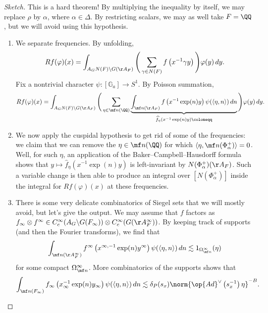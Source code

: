 \documentclass{article}
\begin{document}
\begin{proof}[Sketch]
	This is a hard theorem! By multiplying the inequality by itself, we may replace $\rho$ by $\alpha$, where $\alpha\in\Delta$. By restricting scalars, we may as well take $F=\QQ$, but we will avoid using this hypothesis.
	\begin{enumerate}
		\item We separate frequencies. By unfolding,
		\[Rf(\varphi)(x)=\int_{A_GN(F)\backslash G(\AA_F)}\Bigg(\sum_{\gamma\in N(F)}f\left(x^{-1}\gamma y\right)\Bigg)\varphi(y)\,dy.\]
		Fix a nontrivial character $\psi\colon[\mathbb G_a]\to S^1$. By Poisson summation,
		\[Rf(\varphi)(x)=\int_{A_GN(F)\backslash G(\AA_F)}\Bigg(\sum_{\eta\in\mf n(\QQ)}\underbrace{\int_{\mf n(\AA_F)}f\left(x^{-1}\exp(n)y\right)\psi(\langle\eta,n\rangle)\,dn}_{\widehat f_\eta\left(x^{-1}\exp(n)y\right)\coloneqq}\Bigg)\varphi(y)\,dy.\]
		
		\item We now apply the cuspidal hypothesis to get rid of some of the frequencies: we claim that we can remove the $\eta\in\mf n(\QQ)$ for which $\langle\eta,\mf n(\Phi_\alpha^+)\rangle=0$. Well, for such $\eta$, an application of the Baker--Campbell--Hausdorff formula shows that $y\mapsto\widehat f_\eta\left(x^{-1}\exp(n)y\right)$ is left-invariant by $N(\Phi_\alpha^+)(\AA_F)$. Such a variable change is then able to produce an integral over $[N(\Phi_\alpha^+)]$ inside the integral for $Rf(\varphi)(x)$ at these frequencies.

		\item There is some very delicate combinatorics of Siegel sets that we will mostly avoid, but let's give the output. We may assume that $f$ factors as $f_\infty\otimes f^\infty\in C_c^\infty(A_G\backslash G(F_\infty))\otimes C_c^\infty(G(\AA_F^\infty))$. By keeping track of supports (and then the Fourier transforms), we find that
		\[\int_{\mf n(\AA_F^\infty)}f^\infty\left(x^{\infty,-1}\exp(n)y^\infty\right)\psi(\langle\eta,n\rangle)\,dn\lesssim1_{\Omega_{\mf n}^\infty}(\eta)\]
		for some compact $\Omega_{\mf n}^\infty$. More combinatorics of the supports shows that
		\[\int_{\mf n(F_\infty)}f_\infty\left(x_\infty^{-1}\exp(n)y_\infty\right)\psi(\langle\eta,n\rangle)\,dn\lesssim\delta_P(s_x)\norm{\op{Ad}^\lor\left(s_x^{-1}\right)\eta}^{-B}.\]
		

\end{enumerate}
\end{proof}
\end{document}

